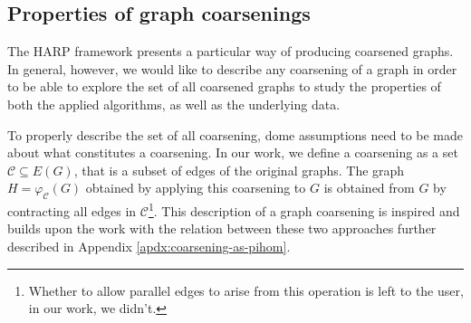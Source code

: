 \subsection{Properties of graph coarsenings}

The HARP framework presents a particular way of producing coarsened graphs. In general, however, we would like to describe any coarsening of a graph in order to be able to explore the set of all coarsened graphs to study the properties of both the applied algorithms, as well as the underlying data.

To properly describe the set of all coarsening, dome assumptions need to be made about what constitutes a coarsening. In our work, we define a coarsening as a set \( \mathcal{C} \subseteq E \left( G \right) \), that is a subset of edges of the original graphs. The graph \( H = \varphi_\mathcal{C} \left( G \right) \) obtained by applying this coarsening to \( G \) is obtained from \( G \) by contracting all edges in \( \mathcal{C} \)\footnote{Whether to allow parallel edges to arise from this operation is left to the user, in our work, we didn't.}. This description of a graph coarsening is inspired and builds upon the work \cite{schulz_mining_2019} with the relation between these two approaches further described in Appendix \ref{apdx:coarsening-as-pihom}.
